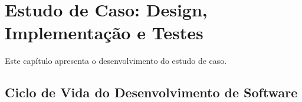 \chapter{Estudo de Caso: Design, Implementação e Testes}
\label{cap:estudo_caso2}

Este capítulo apresenta o desenvolvimento do estudo de caso.

\section{Ciclo de Vida do Desenvolvimento de Software}
